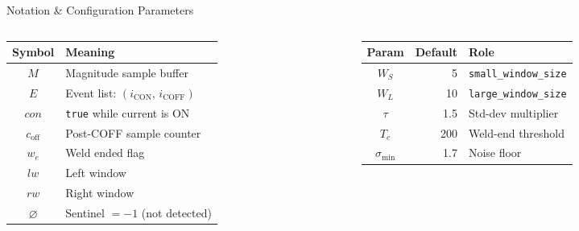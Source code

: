 \documentclass{beamer}
\begin{document}
\begin{frame}{Notation \& Configuration Parameters}
  \begin{columns}[T]
    
    \centering
    \scriptsize
    \begin{tabular}{cl}
      \hline
      \textbf{Symbol} & \textbf{Meaning} \\
      \hline
      $M$             & Magnitude sample buffer \\
      $E$             & Event list: $(i_\text{CON},\,i_\text{COFF})$ \\
      $\mathit{con}$  & \texttt{true} while current is ON \\
      $c_\text{off}$  & Post-COFF sample counter \\
      $w_e$           & Weld ended flag \\
      $\mathit{lw}$   & Left window \\
      $\mathit{rw}$   & Right window \\
      $\varnothing$   & Sentinel $= -1$ (not detected) \\
      \hline
    \end{tabular}

    \centering
    \scriptsize
    \begin{tabular}{crl}
      \hline
      \textbf{Param} & \textbf{Default} & \textbf{Role} \\
      \hline
      $W_S$ & 5  & \texttt{small\_window\_size} \\
      $W_L$ & 10  & \texttt{large\_window\_size} \\
      $\tau$ & 1.5 & Std-dev multiplier \\
      $T_e$ & 200 & Weld-end threshold \\
      $\sigma_\text{min}$ & 1.7 & Noise floor \\
      \hline
    \end{tabular}
  \end{columns}
\end{frame}
\end{document}
